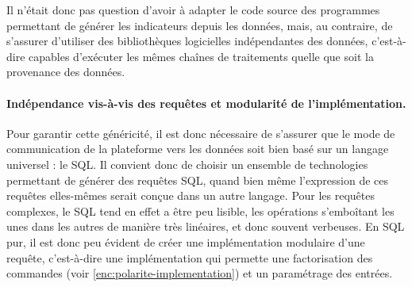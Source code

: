 Il n'était donc pas question d'avoir à adapter le code source des programmes permettant de générer les indicateurs depuis les données, mais, au contraire, de s'assurer d'utiliser des bibliothèques logicielles indépendantes des données, c'est-à-dire capables d'exécuter les mêmes chaînes de traitements quelle que soit la provenance des données.

%

\paragraph{Indépendance vis-à-vis des requêtes et modularité de l'implémentation. \label{par:DSL}}

Pour garantir cette généricité, il est donc nécessaire de s'assurer que le mode de communication de la plateforme vers les données soit bien basé sur un langage universel : le SQL.
Il convient donc de choisir un ensemble de technologies permettant de générer des requêtes SQL, quand bien même l'expression de ces requêtes elles-mêmes serait conçue dans un autre langage.
Pour les requêtes complexes, le SQL tend en effet a être peu lisible, les opérations s'emboîtant les unes dans les autres de manière très linéaires, et donc souvent verbeuses.
En SQL pur, il est donc peu évident de créer une implémentation modulaire d'une requête, c'est-à-dire une implémentation qui permette une factorisation des commandes (voir \cref{enc:polarite-implementation}) et un paramétrage des entrées.

